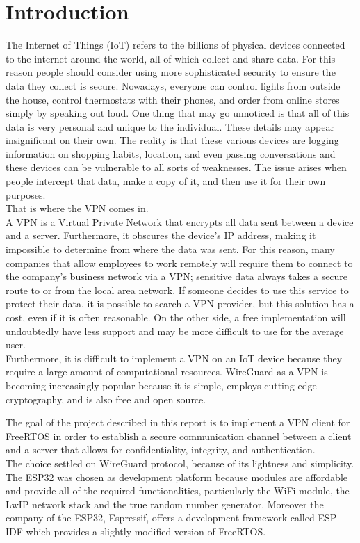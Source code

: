 \chapter{Introduction}

The Internet of Things (IoT) refers to the billions of physical devices connected to the internet around the world, all of which collect and share data. For this reason people should consider using more sophisticated security to ensure the data they collect is secure. Nowadays, everyone can control lights from outside the house, control thermostats with their phones,
and order from online stores simply by speaking out loud. One thing that may go unnoticed is that all of this data is very personal and unique to the individual. These details may appear insignificant on their own.
The reality is that these various devices are logging information on shopping habits, location, and even passing conversations and these devices can be vulnerable to all sorts of weaknesses.
The issue arises when people intercept that data, make a copy of it, and then use it for their own purposes.\\
That is where the VPN comes in.\\
A VPN is a Virtual Private Network that encrypts all data sent between a device and a server. Furthermore, it obscures the device's IP address, making it impossible to determine from where the data was sent. For this reason, many companies that allow employees to work remotely will require them to connect to the company's business network via a VPN; sensitive data always takes a secure route to or from the local area network.
If someone decides to use this service to protect their data, it is possible to search a VPN provider, but this solution has a cost, even if it is often reasonable. On the other side, a free implementation will undoubtedly have less support and may be more difficult to use for the average user.\\
Furthermore, it is difficult to implement a VPN on an IoT device because they require a large amount of computational resources. WireGuard as a VPN is becoming increasingly popular because it is simple, employs cutting-edge cryptography, and is also free and open source.

The goal of the project described in this report is to implement a VPN client for FreeRTOS in order to establish a secure communication channel between a client and a server that allows for confidentiality, integrity, and authentication.\\ The choice settled on WireGuard protocol, because of its lightness and simplicity.\\
The ESP32 was chosen as development platform because modules are affordable and provide all of the required functionalities, particularly the WiFi module, the LwIP network stack and the true random number generator. Moreover the company of the ESP32, Espressif, offers a development framework called ESP-IDF which provides a slightly modified version of FreeRTOS.

